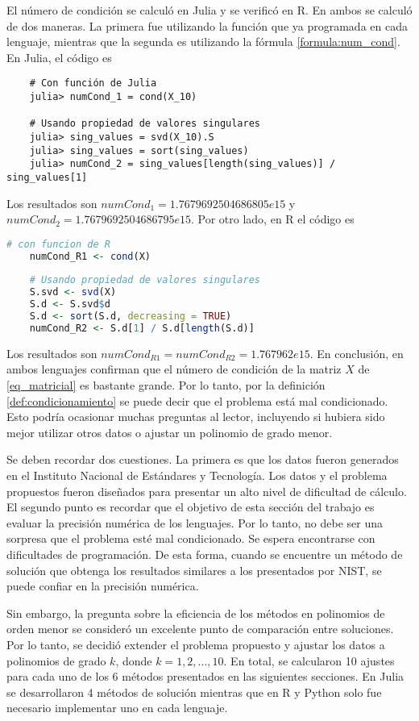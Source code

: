 El número de condición se calculó en \textsf{Julia} y se verificó en \textsf{R}. En ambos se calculó de dos maneras. La primera fue utilizando la función que ya programada en cada lenguaje, mientras que la segunda es utilizando la fórmula \ref{formula:num_cond}. En Julia, el código es 

\begin{verbatim}
	# Con función de Julia
	julia> numCond_1 = cond(X_10)
	
	# Usando propiedad de valores singulares
	julia> sing_values = svd(X_10).S
	julia> sing_values = sort(sing_values)
	julia> numCond_2 = sing_values[length(sing_values)] / sing_values[1]
\end{verbatim}

Los resultados son $numCond_1 = 1.7679692504686805e15$ y $numCond_2 = 1.7679692504686795e15$. Por otro lado, en R el código es 

\begin{lstlisting}[language=R]
	# con funcion de R
	numCond_R1 <- cond(X)
	
	# Usando propiedad de valores singulares
	S.svd <- svd(X)
	S.d <- S.svd$d
	S.d <- sort(S.d, decreasing = TRUE)
	numCond_R2 <- S.d[1] / S.d[length(S.d)]
\end{lstlisting}

Los resultados son $numCond_{R1} = numCond_{R2} = 1.767962e{15}$. En conclusión, en ambos lenguajes confirman que el número de condición de la matriz $X$ de \ref{eq_matricial} es bastante grande. Por lo tanto, por la definición \ref{def:condicionamiento} se puede decir que el problema está mal condicionado. Esto podría ocasionar muchas preguntas al lector, incluyendo si hubiera sido mejor utilizar otros datos o ajustar un polinomio de grado menor. 

Se deben recordar dos cuestiones. La primera es que los datos fueron generados en el Instituto Nacional de Estándares y Tecnología. Los datos y el problema propuestos fueron diseñados para presentar un alto nivel de dificultad de cálculo. El segundo punto es recordar que el objetivo de esta sección del trabajo es evaluar la precisión numérica de los lenguajes. Por lo tanto, no debe ser una sorpresa que el problema esté mal condicionado. Se espera encontrarse con dificultades de programación. De esta forma, cuando se encuentre un método de solución que obtenga los resultados similares a los presentados por NIST, se puede confiar en la precisión numérica. 

Sin embargo, la pregunta sobre la eficiencia de los métodos en polinomios de orden menor se consideró un excelente punto de comparación entre soluciones. Por lo tanto, se decidió extender el problema propuesto y ajustar los datos a polinomios de grado $k$, donde $k = 1, 2, \dots, 10$. En total, se calcularon 10 ajustes para cada uno de los 6 métodos presentados en las siguientes secciones. En \textsf{Julia} se desarrollaron 4 métodos de solución mientras que en \textsf{R} y \textsf{Python} solo fue necesario implementar uno en cada lenguaje. 

